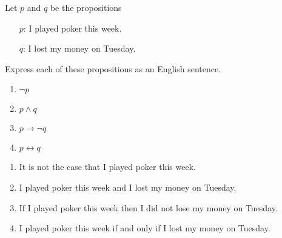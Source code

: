 \documentclass[12pt,addpoints]{exam}
\begin{document}
\begin{questions}
\question Let $p$ and $q$ be the propositions
 \begin{itemize}[itemsep=0pt,parsep=0pt,topsep=0pt,partopsep=0pt]
    \item[$p$:] I played poker this week.
    \item[$q$:] I lost my money on Tuesday.
 \end{itemize}
 Express each of these propositions as an English sentence.
    \begin{enumerate}[label=(\alph*),itemsep=0pt,parsep=0pt,topsep=0pt,partopsep=0pt]
    \item $\neg p$
    \item $p \wedge q$
    \item $p \rightarrow \neg q$
    \item $p \leftrightarrow q$
    \end{enumerate}
    \ifprintanswers
        \vspace{-15pt}
    \fi
    \begin{solution}
        \begin{enumerate}[label=(\alph*),itemsep=0pt,parsep=0pt,topsep=0pt,partopsep=0pt]
        \item It is not the case that I played poker this week.
        \item I played poker this week and I lost my money on Tuesday.
        \item If I played poker this week then I did not lose my money on Tuesday.
        \item I played poker this week if and only if I lost my money on Tuesday.
        \end{enumerate}
    \end{solution}


\end{questions}
\end{document}
